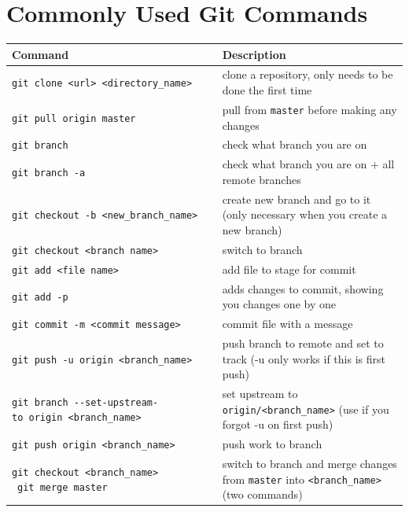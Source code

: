 \documentclass[
]{book}
\begin{document}
\hypertarget{commonly-used-git-commands}{%
\section{Commonly Used Git Commands}\label{commonly-used-git-commands}}

\begin{longtable}[]{@{}
  >{\raggedright\arraybackslash}p{}
  >{\raggedright\arraybackslash}p{}@{}}
\toprule
Command & Description \\
\midrule
\endhead
\texttt{git\ clone\ \textless{}url\textgreater{}\ \textless{}directory\_name\textgreater{}} & clone a repository, only needs to be done the first time \\
\texttt{git\ pull\ origin\ master} & pull from \texttt{master} before making any changes \\
\texttt{git\ branch} & check what branch you are on \\
\texttt{git\ branch\ -a} & check what branch you are on + all remote branches \\
\texttt{git\ checkout\ -b\ \textless{}new\_branch\_name\textgreater{}} & create new branch and go to it (only necessary when you create a new branch) \\
\texttt{git\ checkout\ \textless{}branch\ name\textgreater{}} & switch to branch \\
\texttt{git\ add\ \textless{}file\ name\textgreater{}} & add file to stage for commit \\
\texttt{git\ add\ -p} & adds changes to commit, showing you changes one by one \\
\texttt{git\ commit\ -m\ \textless{}commit\ message\textgreater{}} & commit file with a message \\
\texttt{git\ push\ -u\ origin\ \textless{}branch\_name\textgreater{}} & push branch to remote and set to track (-u only works if this is first push) \\
\texttt{git\ branch\ -\/-set-upstream-to\ origin\ \textless{}branch\_name\textgreater{}} & set upstream to \texttt{origin/\textless{}branch\_name\textgreater{}} (use if you forgot -u on first push) \\
\texttt{git\ push\ origin\ \textless{}branch\_name\textgreater{}} & push work to branch \\
\texttt{git\ checkout\ \textless{}branch\_name\textgreater{}} ~\texttt{git\ merge\ master} & switch to branch and merge changes from \texttt{master} into \texttt{\textless{}branch\_name\textgreater{}} (two commands) \\

\end{longtable}
\end{document}

